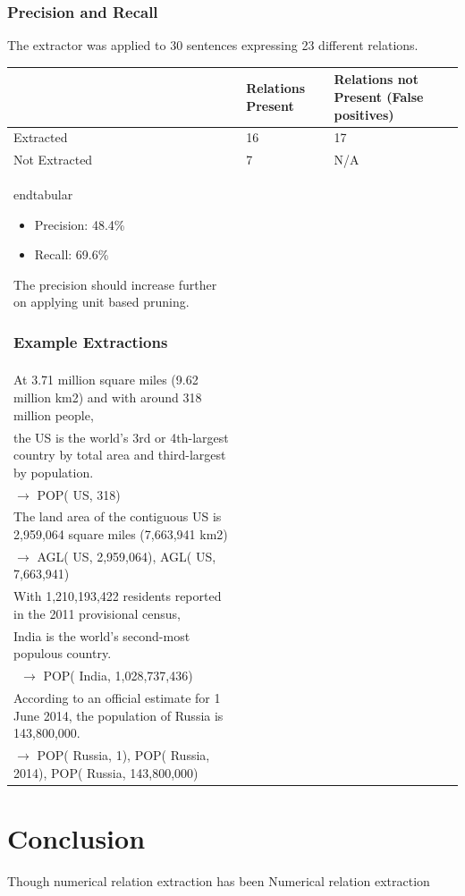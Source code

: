 \documentclass[a4paper,10pt]{article}
\begin{document}
\subsubsection{Precision and Recall}
The extractor was applied to 30 sentences expressing 23 different relations.
\begin{tabular}{|l|l|l|}
\hline
& Relations Present & Relations not Present (False positives) \\
\hline
Extracted & 16 & 17 \\
\hline
Not Extracted & 7 & N/A \\
\hline
end{tabular}
 \begin{itemize}
  \item Precision: 48.4\%
  \item Recall: 69.6\%
 \end{itemize}

The precision should increase further on applying unit based pruning.

\subsubsection{Example Extractions}
\begin{tabular}{|l|} 
\hline
Sentence $\rightarrow$ Extraction \\
\hline
At 3.71 million square miles (9.62 million km2) and with around 318 million people,\\ 
the US is the world's 3rd or 4th-largest country by total area and third-largest by population. \\$\rightarrow$ POP( US, 318) \\
\hline
The land area of the contiguous US is 2,959,064 square miles (7,663,941 km2)\\ $\rightarrow$  AGL( US, 2,959,064), AGL( US, 7,663,941) \\
\hline
With 1,210,193,422 residents reported in the 2011 provisional census,\\ 
India is the world's second-most populous country.\\\ $\rightarrow$ POP( India, 1,028,737,436)\\ 
\hline
According to an official estimate for 1 June 2014, the population of Russia is 143,800,000.\\ $\rightarrow$
POP( Russia, 1), POP( Russia, 2014), POP( Russia, 143,800,000) \\
\hline
\end{tabular}

\section{Conclusion}
Though numerical relation extraction has been Numerical relation extraction 
%
%
%

\end{document}
